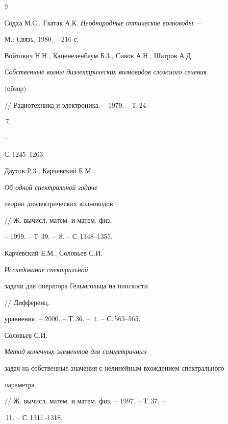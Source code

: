 \begin{thebibliography}{9} 


 




Содха М.С., Гхатак А.К. {\em Неоднородные оптические волноводы}. -- 


М.: Связь, 1980. -- 216 с. 




Войтович Н.Н., Каценеленбаум Б.3., Сивов А.Н., Шатров А.Д. 


{\em Собственные волны диэлектрических волноводов сложного сечения 


$($обзор$)$} // Радиотехника и электроника. -- 1979. -- Т.\,24. -- 


\No\,7. 


-- 


С.\,1245--1263. 




Даутов Р.3., Карчевский Е.М. {\em Об одной спектральной задаче 


теории диэлектрических волноводов} // Ж. вычисл. матем. и матем. физ. 


-- 1999. -- Т.\,39. -- \No\,8. -- С.\,1348--1355. 




Карчевский Е.М., Соловьев С.И. {\em Исследование спектральной 


задачи для оператора Гельмгольца на плоскости} // Дифференц. 


уравнения. -- 2000. -- Т.\,36. -- \No\,4. -- С.\,563--565. 




Соловьев С.И. {\em Метод конечных элементов для симметричных 


задач на собственные значения с нелинейным вхождением спектрального 


параметра} // Ж. вычисл. матем. и матем. физ. -- 1997. -- Т.\,37. -- 


\No\,11. -- С.\,1311--1318. 


 


\end{thebibliography} 


 


\vskip 2cm 


 






 


\label{end} 


 


